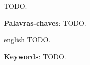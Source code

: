 
\setlength{\absparsep}{18pt} %
\begin{resumo}
TODO.

 \textbf{Palavras-chaves}: TODO.
\end{resumo}

\begin{resumo}[Abstract]
 \begin{otherlanguage*}{english}
   TODO.

   \vspace{\onelineskip}
 
   \noindent 
   \textbf{Keywords}: TODO.
 \end{otherlanguage*}
\end{resumo}